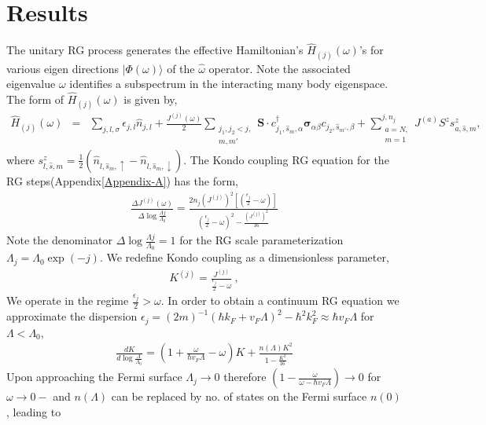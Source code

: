 \documentclass[aps,prx,preprint,groupedaddress]{revtex4-2}
\begin{document}
\section{Results}
\par\noindent
The unitary RG process generates the effective Hamiltonian's $\hat{H}_{(j)}(\omega)$'s for various eigen directions $|\Phi(\omega)\rangle$
of the $\hat{\omega}$ operator. Note the associated eigenvalue $\omega$ identifies a subspectrum in the interacting many body eigenspace. The form of $\hat{H}_{(j)}(\omega)$ is given by,
\begin{eqnarray}
\hat{H}_{(j)}(\omega) &=& \sum_{j,l,\sigma}\epsilon_{j,l}\hat{n}_{j,l}+\frac{J^{(j)}(\omega)}{2}\sum_{\substack{j_{1},j_{2}<j,\\ m,m'}}\mathbf{S}\cdot c^{\dagger}_{j_{1},\hat{s}_{m},\alpha}\boldsymbol{\sigma}_{\alpha\beta}c_{j_{2},\hat{s}_{m'},\beta}+\sum^{j,n_{j}}_{\substack{a=N,\\ m=1}}J^{(a)}S^{z}s^{z}_{a,\hat{s},m},
\end{eqnarray}
where  $s^{z}_{l,\hat{s},m}=\frac{1}{2}(\hat{n}_{l,\hat{s}_{m},\uparrow}-\hat{n}_{l,\hat{s}_{m},\downarrow})$. The Kondo coupling RG equation for the RG steps(Appendix\ref{Appendix-A}) has the form,
\begin{eqnarray}
\frac{\Delta J^{(j)}(\omega)}{\Delta\log\frac{\Lambda{j}}{\Lambda_{0}}}=\frac{2n_{j}(J^{(j)})^{2}\left[(\frac{\epsilon_{j}}{2}-\omega)\right]}{(\frac{\epsilon_{j}}{2}-\omega)^{2}-\frac{\left(J^{(j)}\right)^{2}}{16}}\label{RGeqn}
\end{eqnarray}
Note the denominator $\Delta\log\frac{\Lambda{j}}{\Lambda_{0}} =1$ for the RG scale parameterization $\Lambda_{j}=\Lambda_{0}\exp(-j)$. We redefine Kondo coupling as a dimensionless parameter,
\begin{eqnarray}
K^{(j)}=\frac{J^{(j)}}{\frac{\epsilon_{j}}{2}-\omega}~,\label{reparametrization}
\end{eqnarray} 
We operate in the regime $\frac{\epsilon_{j}}{2}>\omega$. In order to obtain a continuum RG equation we approximate the dispersion  $\epsilon_{j}=(2m)^{-1}(\hbar k_{F}+v_{F}\Lambda)^{2}-\hbar^{2}k_{F}^{2}\approx \hbar v_{F}\Lambda$ for $\Lambda<\Lambda_{0}$,
\begin{eqnarray}
\frac{d K}{d\log\frac{\Lambda}{\Lambda_{0}}}=\left(1+\frac{\omega}{\hbar v_{F}\Lambda}-\omega\right)K+\frac{n(\Lambda)K^{2}}{1-\frac{K^{2}}{16}}
\end{eqnarray}
Upon approaching the Fermi surface $\Lambda_{j}\to 0$ therefore $\left(1-\frac{\omega}{\omega-\hbar v_{F}\Lambda}\right)\to 0$ for $\omega\to 0-$  and $n(\Lambda)$ can be replaced by no. of states on the Fermi surface $n(0)$, leading to 
\end{document}
